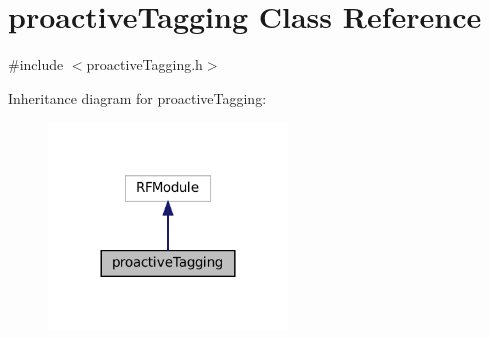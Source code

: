 \hypertarget{classproactiveTagging}{}\section{proactive\+Tagging Class Reference}
\label{classproactiveTagging}


{\ttfamily \#include $<$proactive\+Tagging.\+h$>$}



Inheritance diagram for proactive\+Tagging\+:
\nopagebreak
\begin{figure}[H]
\begin{center}
\leavevmode
\includegraphics[width=180pt]{classproactiveTagging__inherit__graph}
\end{center}
\end{figure}
